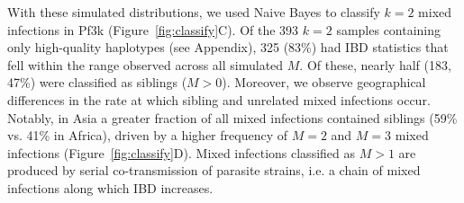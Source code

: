 \documentclass[9pt,lineno]{elife}
\begin{document}
With these simulated distributions, we used Naive Bayes to classify $k=2$ mixed infections in Pf3k (Figure~\ref{fig:classify}C).  Of the 393  $k = 2$ samples containing only high-quality haplotypes (see Appendix), 325 (83\%) had IBD statistics that fell within the range observed across all simulated $M$. Of these, nearly half (183, 47\%) were classified as siblings ($M > 0$).  Moreover, we observe geographical differences in the rate at which sibling and unrelated mixed infections occur. Notably, in Asia a greater fraction of all mixed infections contained siblings (59\% vs. 41\% in Africa), driven by a higher frequency of $M=2$ and $M=3$ mixed infections (Figure~\ref{fig:classify}D).  Mixed infections classified as $M>1$ are produced by serial co-transmission of  parasite strains, i.e. a chain of mixed infections along which IBD increases.
\end{document}
